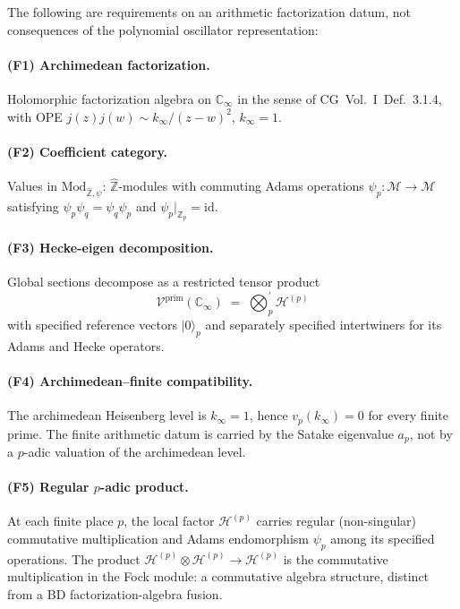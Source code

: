 \begin{definition}
\label{v4-arith:def:CG-arithmetic-factorization}
The following are requirements on an arithmetic factorization datum,
not consequences of the polynomial oscillator representation:

\paragraph{(F1) Archimedean factorization.} Holomorphic
factorization algebra on \(\mathbb{C}_{\infty}\) in the sense of
CG~Vol.~I~Def.~3.1.4, with OPE
\(j(z)j(w)\sim k_{\infty}/(z-w)^{2}\), \(k_{\infty}=1\).

\paragraph{(F2) Coefficient category.} Values in
\(\mathrm{Mod}_{\widehat{\mathbb{Z}},\psi}\):
\(\widehat{\mathbb{Z}}\)-modules with commuting Adams operations
\(\psi_{p}\colon\mathcal{M}\to\mathcal{M}\) satisfying
\(\psi_{p}\psi_{q}=\psi_{q}\psi_{p}\) and \(\psi_{p}|_{\mathbb{Z}_{p}}=\mathrm{id}\).

\paragraph{(F3) Hecke-eigen decomposition.} Global sections
decompose as a restricted tensor product
\begin{equation*}
\mathcal{V}^{\mathrm{prim}}(\mathbb{C}_{\infty})\;=\;\bigotimes_{p}^{\prime}\mathcal{H}^{(p)}
\end{equation*}
with specified reference vectors \(|0\rangle_p\) and separately
specified intertwiners for its Adams and Hecke operators.

\paragraph{(F4) Archimedean--finite compatibility.} The
archimedean Heisenberg level is \(k_{\infty}=1\), hence
\(v_{p}(k_{\infty})=0\) for every finite prime. The finite
arithmetic datum is carried by the Satake eigenvalue \(a_{p}\), not by
a \(p\)-adic valuation of the archimedean level.

\paragraph{(F5) Regular \(p\)-adic product.} At each finite place
\(p\), the local factor \(\mathcal{H}^{(p)}\) carries regular
(non-singular) commutative multiplication and Adams endomorphism
\(\psi_p\) among its specified operations. The product
\(\mathcal{H}^{(p)}\otimes\mathcal{H}^{(p)}\to\mathcal{H}^{(p)}\) is
the commutative multiplication in the Fock module: a commutative
algebra structure, distinct from a BD factorization-algebra fusion.
\end{definition}

